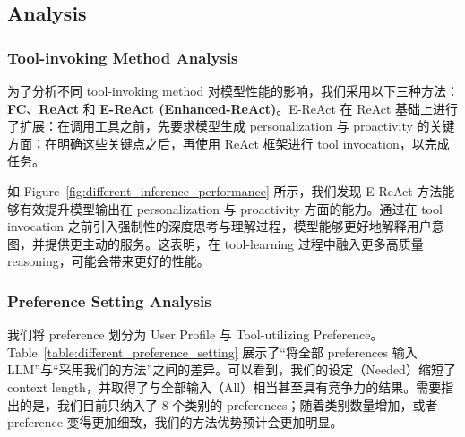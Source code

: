 \documentclass[11pt]{article}
\begin{document}
\subsection{Analysis}
\subsubsection{Tool-invoking Method Analysis}
为了分析不同 tool-invoking method 对模型性能的影响，我们采用以下三种方法：\textbf{FC}、\textbf{ReAct} 和 \textbf{E-ReAct (Enhanced-ReAct)}。E-ReAct 在 ReAct 基础上进行了扩展：在调用工具之前，先要求模型生成 personalization 与 proactivity 的关键方面；在明确这些关键点之后，再使用 ReAct 框架进行 tool invocation，以完成任务。




如 Figure~\ref{fig:different_inference_performance} 所示，我们发现 E-ReAct 方法能够有效提升模型输出在 personalization 与 proactivity 方面的能力。通过在 tool invocation 之前引入强制性的深度思考与理解过程，模型能够更好地解释用户意图，并提供更主动的服务。这表明，在 tool-learning 过程中融入更多高质量 reasoning，可能会带来更好的性能。



\begin{table}[]
    \centering
    \caption{不同 preference setting 在子集数据上的评测结果。 \textit{Tokens} 指标表示由 Llama-3.1-70B-Instruct 的 tokenizer 计算得到的每条 instruction 的平均 token 数。性能测试模型为 GPT-4o。 
    }
    
    \label{table:different_preference_setting}
\end{table}
\subsubsection{Preference Setting Analysis}
我们将 preference 划分为 User Profile 与 Tool-utilizing Preference。Table~\ref{table:different_preference_setting} 展示了“将全部 preferences 输入 LLM”与“采用我们的方法”之间的差异。可以看到，我们的设定（Needed）缩短了 context length，并取得了与全部输入（All）相当甚至具有竞争力的结果。需要指出的是，我们目前只纳入了 8 个类别的 preferences；随着类别数量增加，或者 preference 变得更加细致，我们的方法优势预计会更加明显。
\end{document}
